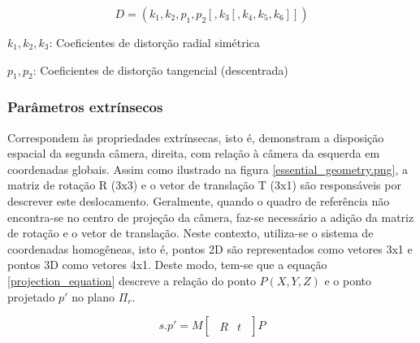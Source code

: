 \begin{equation}
  D = (k_1,k_2,p_1,p_2[,k_3[,k_4,k_5,k_6]])
\end{equation}

\begin{center}
  $k_1,k_2,k_3$: Coeficientes de distorção radial simétrica
  
  $p_1,p_2$: Coeficientes de distorção tangencial (descentrada)
\end{center}

\subsubsection{Parâmetros extrínsecos}
Correspondem às propriedades extrínsecas, isto é, demonstram a disposição espacial da segunda câmera, direita, com relação à câmera da esquerda em coordenadas globais. Assim como ilustrado na figura \ref{essential_geometry.png}, a matriz de rotação R (3x3) e o vetor de translação T (3x1) são responsáveis por descrever este deslocamento. Geralmente, quando o quadro de referência não encontra-se no centro de projeção da câmera, faz-se necessário a adição da matriz de rotação e o vetor de translação. Neste contexto, utiliza-se o sistema de coordenadas homogêneas, isto é, pontos 2D são representados como vetores 3x1 e pontos 3D como vetores 4x1. Deste modo, tem-se que a equação \ref{projection_equation} descreve a relação do ponto $P(X,Y,Z)$ e o ponto projetado $p'$ no plano $\Pi_r$\cite{RobertLaganiere}.

\begin{equation}
  s.p' = M
  \begin{bmatrix}
  \begin{array}{c|c}
  R & t
  \end{array}
  \end{bmatrix}
  P 
\end{equation}

